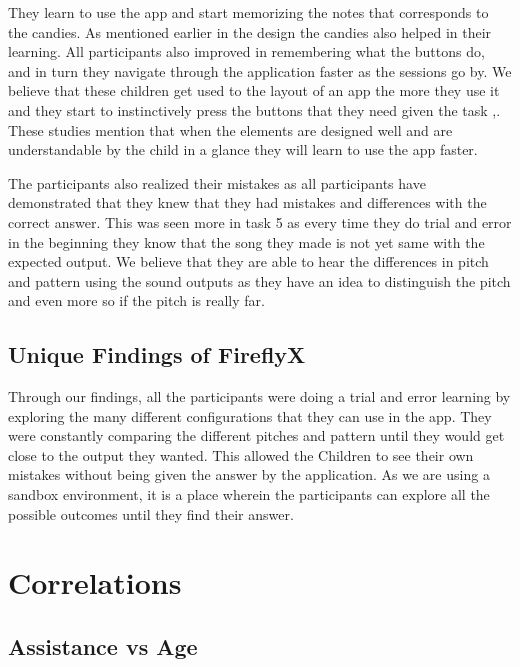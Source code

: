They learn to use the app and start memorizing the notes that corresponds to the candies. As mentioned earlier in the design the candies also helped in their learning. All participants also improved in remembering what the buttons do, and in turn they navigate through the application faster as the sessions go by. We believe that these children get used to the layout of an app the more they use it and they start to instinctively press the buttons that they need given the task \cite{wiedenbeck1999use},\cite{ibharim2014ibuat}. These studies mention that when the elements are designed well and are understandable by the child in a glance they will learn to use the app faster.


The participants also realized their mistakes as all participants have demonstrated that they knew that they had mistakes and differences with the correct answer. This was seen more in task 5 as every time they do trial and error in the beginning they know that the song they made is not yet same with the expected output. We believe that they are able to hear the differences in pitch and pattern using the sound outputs as they have an idea to distinguish the pitch and even more so if the pitch is really far. 



\subsection{Unique Findings of FireflyX}

Through our findings, all the participants were doing a trial and error learning by exploring the many different configurations that they can use in the app. They were constantly comparing the different pitches and pattern until they would get close to the output they wanted. This allowed the Children to see their own mistakes without being given the answer by the application. As we are using a sandbox environment, it is a place wherein the participants can explore all the possible outcomes until they find their answer.

\section{Correlations}

\subsection{Assistance vs Age}







